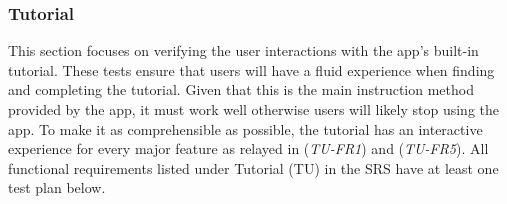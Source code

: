 \documentclass[12pt, titlepage]{article}
\begin{document}


\subsubsection{Tutorial}

This section focuses on verifying the user interactions with the app's built-in tutorial. These tests ensure that users will have a fluid experience when finding and completing the tutorial. Given that this is the main instruction method provided by the app, it must work well otherwise users will likely stop using the app. To make it as comprehensible as possible, the tutorial has an interactive experience for every major feature as relayed in (\textit{TU-FR1}) and (\textit{TU-FR5}).  All functional requirements listed under Tutorial (TU) in the SRS \cite{SRS} have at least one test plan below.
\end{document}
